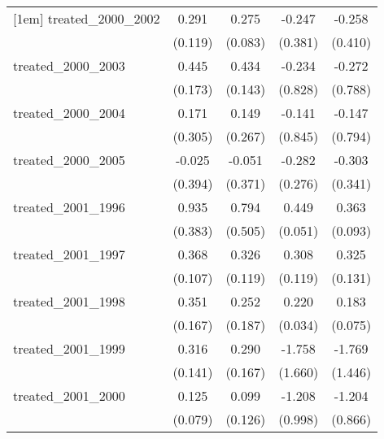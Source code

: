 {\begin{tabular}{l*{4}{c}}
[1em]
treated\_2000\_2002&       0.291\sym{*}  &       0.275\sym{***}&      -0.247         &      -0.258         \\
            &     (0.119)         &     (0.083)         &     (0.381)         &     (0.410)         \\
[1em]
treated\_2000\_2003&       0.445\sym{*}  &       0.434\sym{**} &      -0.234         &      -0.272         \\
            &     (0.173)         &     (0.143)         &     (0.828)         &     (0.788)         \\
[1em]
treated\_2000\_2004&       0.171         &       0.149         &      -0.141         &      -0.147         \\
            &     (0.305)         &     (0.267)         &     (0.845)         &     (0.794)         \\
[1em]
treated\_2000\_2005&      -0.025         &      -0.051         &      -0.282         &      -0.303         \\
            &     (0.394)         &     (0.371)         &     (0.276)         &     (0.341)         \\
[1em]
treated\_2001\_1996&       0.935\sym{*}  &       0.794         &       0.449\sym{***}&       0.363\sym{***}\\
            &     (0.383)         &     (0.505)         &     (0.051)         &     (0.093)         \\
[1em]
treated\_2001\_1997&       0.368\sym{***}&       0.326\sym{**} &       0.308\sym{**} &       0.325\sym{*}  \\
            &     (0.107)         &     (0.119)         &     (0.119)         &     (0.131)         \\
[1em]
treated\_2001\_1998&       0.351\sym{*}  &       0.252         &       0.220\sym{***}&       0.183\sym{*}  \\
            &     (0.167)         &     (0.187)         &     (0.034)         &     (0.075)         \\
[1em]
treated\_2001\_1999&       0.316\sym{*}  &       0.290         &      -1.758         &      -1.769         \\
            &     (0.141)         &     (0.167)         &     (1.660)         &     (1.446)         \\
[1em]
treated\_2001\_2000&       0.125         &       0.099         &      -1.208         &      -1.204         \\
            &     (0.079)         &     (0.126)         &     (0.998)         &     (0.866)         \\

\end{tabular}}
